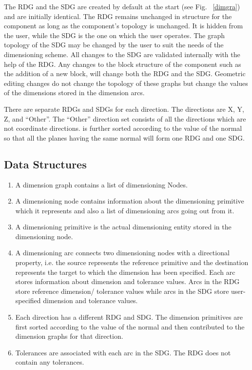         The RDG and the SDG are created by default at the start 
		(see Fig. ~\ref{dimgra})
		and are initially identical. The RDG remains unchanged in structure
        for the component as long as the component's topology is unchanged. 
		It is hidden from the user, while the SDG is the one
        on which the user operates. The graph topology of the SDG may be 
		changed by the user to suit the needs of the dimensioning scheme.
		All changes to the SDG are validated internally with
        the help of the RDG. Any changes to the block structure of the
		component such as the addition of a new block, will 
		change both the RDG and the SDG. Geometric editing changes do not 
		change the topology of these graphs but change the values of the 
		dimensions stored in the dimension arcs.

		There are separate RDGs and SDGs for each direction. The directions
		are X, Y, Z, and ``Other''. The ``Other'' direction set consists of all
		the directions which are not coordinate directions.
		is further sorted according to the value of the normal so
		that all the planes having the same normal will form one RDG and one 
		SDG.

   


        \subsection{Data Structures}

			\begin{enumerate}
			\item
            A dimension graph contains a list of dimensioning Nodes.
			\item
            A dimensioning node contains information about the dimensioning
            primitive which it represents and also a list of dimensioning arcs
            going out from it.
			\item
            A dimensioning primitive is the actual dimensioning entity stored
			in the dimensioning node.
			\item
            A dimensioning arc connects two dimensioning nodes with a 
			directional property, i.e. the source represents the reference 
			primitive and the
            destination represents the target to which the dimension has been
            specified. Each arc stores information about dimension and tolerance
            values. Arcs in the RDG store reference dimension/ tolerance values
            while arcs in the SDG store user-specified dimension and tolerance
            values.
			\item
			Each direction has a different RDG and 
			SDG. The dimension primitives are first sorted according to the
			value of the normal and then contributed to the dimension graphs
			for that direction.

			\item
			Tolerances are associated with each arc in the SDG. The RDG does not
			contain any tolerances.
			\end{enumerate}

